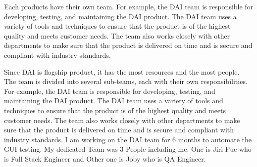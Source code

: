 \documentclass[12pt,a4paper]{report}
\begin{document}
Each products have their own team. For example, the \ac{DAI} team is responsible for developing, testing, and maintaining the \ac{DAI} product. The \ac{DAI} team uses a variety of tools and techniques to ensure that the product is of the highest quality and meets customer needs. The team also works closely with other departments to make sure that the product is delivered on time and is secure and compliant with industry standards.

Since \ac{DAI} is flagship product, it has the most resources and the most people. The team is divided into several sub-teams, each with their own responsibilities. For example, the \ac{DAI} team is responsible for developing, testing, and maintaining the \ac{DAI} product. The \ac{DAI} team uses a variety of tools and techniques to ensure that the product is of the highest quality and meets customer needs. The team also works closely with other departments to make sure that the product is delivered on time and is secure and compliant with industry standards.
I am working on the \ac{DAI} team for 6 months to automate the GUI testing. My dedicated Team was 3 People including me. One is Jiri Puc who is Full Stack Engineer and Other one is Joby who is QA Engineer.
\end{document}
